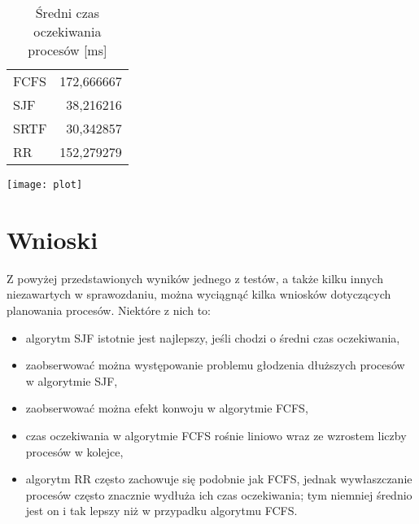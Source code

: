 \documentclass{article}
\begin{document}
\begin{table}[h]
    \centering
    \begin{tabular}{|l|r|}
        \hline
        FCFS & 172,666667 \\
        SJF  & 38,216216 \\
        SRTF & 30,342857 \\
        RR   & 152,279279 \\
        \hline
    \end{tabular}
    \caption{Średni czas oczekiwania procesów [ms]}
    \label{tab:test1czas}
\end{table}

\texttt{[image: plot]}

\section{Wnioski}

Z powyżej przedstawionych wyników jednego z testów,
a także kilku innych niezawartych w sprawozdaniu,
można wyciągnąć kilka wniosków dotyczących planowania procesów.
Niektóre z nich to:

\begin{itemize}
    \item algorytm SJF istotnie jest najlepszy, jeśli chodzi o średni czas oczekiwania,
    \item zaobserwować można występowanie problemu głodzenia dłuższych procesów w algorytmie SJF,
    \item zaobserwować można efekt konwoju w algorytmie FCFS,
    \item czas oczekiwania w algorytmie FCFS rośnie liniowo wraz ze wzrostem liczby procesów w kolejce,
    \item algorytm RR często zachowuje się podobnie jak FCFS,
        jednak wywłaszczanie procesów często znacznie wydłuża ich czas oczekiwania;
        tym niemniej średnio jest on i tak lepszy niż w przypadku algorytmu FCFS.
\end{itemize}
\end{document}
